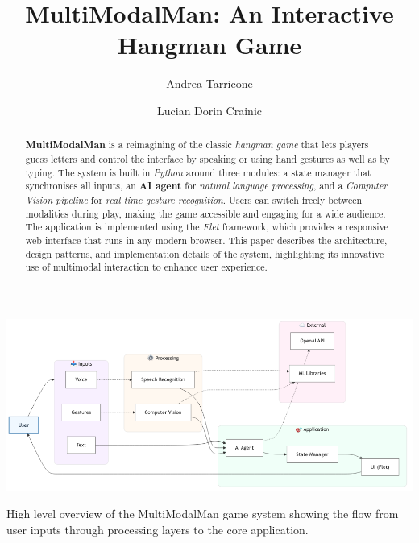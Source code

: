 \documentclass[nonacm,sigplan]{acmart}
\begin{document}
\title[]{MultiModalMan: An Interactive Hangman Game}

\author{Andrea Tarricone}

\author{Lucian Dorin Crainic}

\begin{abstract}
\textbf{MultiModalMan} is a reimagining of the classic \textit{hangman game} that lets players guess letters and control the interface by speaking or using hand gestures as well as by typing. The system is built in \textit{Python} around three modules: a state manager that synchronises all inputs, an \textbf{AI agent} for \textit{natural language processing}, and a \textit{Computer Vision pipeline} for \textit{real time gesture recognition}. Users can switch freely between modalities during play, making the game accessible and engaging for a wide audience. The application is implemented using the \textit{Flet} framework, which provides a responsive web interface that runs in any modern browser. This paper describes the architecture, design patterns, and implementation details of the system, highlighting its innovative use of multimodal interaction to enhance user experience.
\end{abstract}


\begin{teaserfigure}
  \includegraphics[width=\textwidth]{./images/architecture_diagram.png}
  \caption{High level overview of the MultiModalMan game system showing the flow from user inputs through processing layers to the core application.}
\end{teaserfigure}

\maketitle
\pagestyle{plain}












\end{document}
